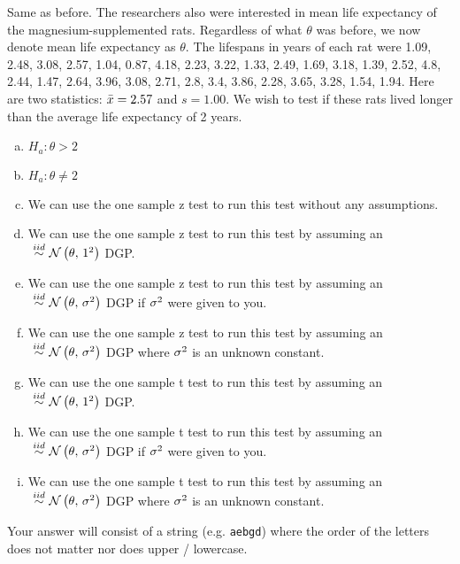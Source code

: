 \documentclass[12pt,landscape]{article}
\newcommand{\instr}{\small Your answer will consist of a string (e.g. \texttt{aebgd}) where the order of the letters does not matter nor does upper / lowercase. \normalsize}
\begin{document}


\problem{} Same as before.  The researchers also were interested in mean life expectancy of the magnesium-supplemented rats. Regardless of what $\theta$ was before, we now denote mean life expectancy as $\theta$.  The lifespans in years of each rat were 1.09, 2.48, 3.08, 2.57, 1.04, 0.87, 4.18, 2.23, 3.22, 1.33, 2.49, 1.69, 3.18, 1.39, 2.52, 4.8, 2.44, 1.47, 2.64, 3.96, 3.08, 2.71, 2.8, 3.4, 3.86, 2.28, 3.65, 3.28, 1.54, 1.94. Here are two statistics: $\bar{x} = 2.57$ and $s = 1.00$. We wish to test if these rats lived longer than the average life expectancy of 2 years. 
\vspace{-0.2cm}\benum{} 

\begin{enumerate}[(a)]
\item $H_a: \theta > 2$
\item $H_a: \theta \neq 2$
\item We can use the one sample z test to run this test without any assumptions.
\item We can use the one sample z test to run this test by assuming an $\iid \normnot{\theta}{1^2}$ DGP.
\item We can use the one sample z test to run this test by assuming an $ \iid \normnot{\theta}{\sigsq}$ DGP if $\sigma^2$ were given to you.
\item We can use the one sample z test to run this test by assuming an $ \iid \normnot{\theta}{\sigsq}$ DGP where $\sigma^2$ is an unknown constant.
\item We can use the one sample t test to run this test by assuming an $ \iid \normnot{\theta}{1^2}$ DGP.
\item We can use the one sample t test to run this test by assuming an $ \iid \normnot{\theta}{\sigsq}$ DGP if $\sigma^2$ were given to you.
\item We can use the one sample t test to run this test by assuming an $\iid \normnot{\theta}{\sigsq}$ DGP where $\sigma^2$ is an unknown constant.
\end{enumerate}
\eenum\instr\pagebreak
\end{document}
